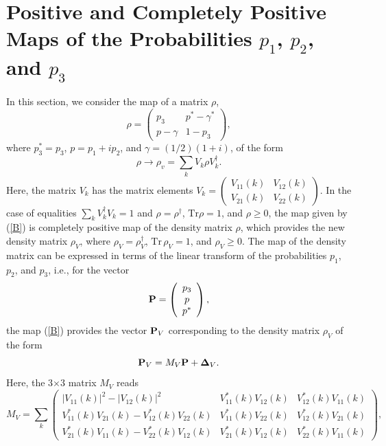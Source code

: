 \documentclass[12pt]{article}
\begin{document}
\section{Positive and Completely Positive Maps of the Probabilities
$%
{p_1}$, $%
{p_2}$, and $
{p_3}$}
In this section, we consider the map of a matrix $\rho$,
\begin{equation}\label{A}
\rho=\left(\begin{array}{cc}
p_3&p^\ast-\gamma^\ast\\
p-\gamma & 1-p_3
\end{array}\right),
\end{equation}
where $p_3^\ast=p_3$, $p=p_1+ip_2$, and $\gamma=({1}/{2})(1+i)$, of
the form
\begin{equation}\label{B}
\rho\longrightarrow\rho_v=\sum_k V_k\rho V_k^\dagger.
\end{equation}
Here, the matrix $V_k$ has the matrix elements
$V_k=\left(\begin{array}{cc}
V_{11}(k)&V_{12}(k)\\
V_{21}(k)&V_{22}(k)
\end{array}
\right)$.
In the case of equalities $\sum_k V_k^\dagger V_k=1$ and
$\rho=\rho^\dagger$, $\mbox{Tr}\rho=1$, and $\rho\geq 0$, the map
given by (\ref{B}) is completely positive map of the density matrix
$\rho$, which provides the new density matrix $\rho_V$, where
$\rho_V=\rho_V^\dagger$, $\mbox{Tr}\,\rho_V=1$, and $\rho_V\geq 0$.
The map of the density matrix can be expressed in terms of the
linear transform of the probabilities $p_1$, $p_2$, and $p_3$, i.e.,
for the vector\\[-11mm]
\begin{equation}\label{D}
{\bf P}=\left(\begin{array}{ccc} p_3\\p\\p^\ast
\end{array}\right),
\end{equation}
the map (\ref{B}) provides the vector ${\bf P}_V$ corresponding to
the density matrix $\rho_V$ of the form
\begin{equation}\label{E}
{\bf P}_V=M_V{\bf P}+{\bf \Delta}_V.
\end{equation}
Here, the 3$\times$3 matrix $M_V$ reads
\begin{equation}\label{F}
M_V=\sum_k\left(\begin{array}{ccc}
|V_{11}(k)|^2-|V_{12}(k)|^2&V_{11}^\ast(k)V_{12}(k)&V^\ast_{12}(k)V_{11}(k)\\
V_{11}^\ast(k)V_{21}(k)-V_{12}^\ast(k)V_{22}(k)&V_{11}^\ast(k)V_{22}(k)&V_{12}^\ast(k)V_{21}(k)\\
V_{21}^\ast(k)V_{11}(k)-V_{22}^\ast(k)V_{12}(k)&V_{21}^\ast(k)V_{12}(k)&V_{22}^\ast(k)V_{11}(k)
\end{array}\right),
\end{equation}
\end{document}
